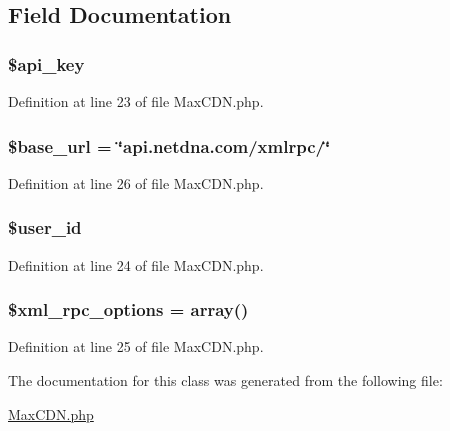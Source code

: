 \subsection{Field Documentation}
\hypertarget{class_max_c_d_n_a186dfe06d14a3bc248c4eb4bcdaec562}{
\subsubsection[{\$api\_\-key}]{\setlength{\rightskip}{0pt plus 5cm}\$api\_\-key}}
\label{class_max_c_d_n_a186dfe06d14a3bc248c4eb4bcdaec562}


Definition at line 23 of file MaxCDN.php.

\hypertarget{class_max_c_d_n_a6886427c9c643f707fcb35c018049bc7}{
\subsubsection[{\$base\_\-url}]{\setlength{\rightskip}{0pt plus 5cm}\$base\_\-url = \char`\"{}api.netdna.com/xmlrpc/\char`\"{}}}
\label{class_max_c_d_n_a6886427c9c643f707fcb35c018049bc7}


Definition at line 26 of file MaxCDN.php.

\hypertarget{class_max_c_d_n_af0fcd925f00973e32f7214859dfb3c6b}{
\subsubsection[{\$user\_\-id}]{\setlength{\rightskip}{0pt plus 5cm}\$user\_\-id}}
\label{class_max_c_d_n_af0fcd925f00973e32f7214859dfb3c6b}


Definition at line 24 of file MaxCDN.php.

\hypertarget{class_max_c_d_n_aa9300810e8d9adff7d3fdc176c218363}{
\subsubsection[{\$xml\_\-rpc\_\-options}]{\setlength{\rightskip}{0pt plus 5cm}\$xml\_\-rpc\_\-options = array()}}
\label{class_max_c_d_n_aa9300810e8d9adff7d3fdc176c218363}


Definition at line 25 of file MaxCDN.php.



The documentation for this class was generated from the following file:\begin{DoxyCompactItemize}
\item 
\hyperlink{_max_c_d_n_8php}{MaxCDN.php}\end{DoxyCompactItemize}
